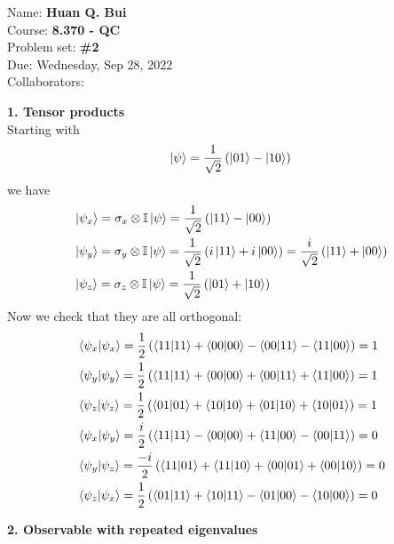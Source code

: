 \documentclass{article}
\theoremstyle{definition}
\newcommand{\f}[2]{\frac{#1}{#2}}
\newcommand{\lp}{\left(}
\newcommand{\rp}{\right)}
\begin{document}
\begin{framed}
\noindent Name: \textbf{Huan Q. Bui}\\
Course: \textbf{8.370 - QC}\\
Problem set: \textbf{\#2}\\
Due: Wednesday, Sep 28, 2022\\
Collaborators: 
\end{framed}

\noindent \textbf{1. Tensor products}\\

\noindent Starting with
\begin{align*}
	\ket{\psi} = \f{1}{\sqrt{2}}\lp \ket{01} - \ket{10} \rp
\end{align*}
we have
\begin{align*}
	&\ket{\psi_x} = \sigma_x \otimes \mathbb{I} \ket{\psi} = \f{1}{\sqrt{2}}\lp \ket{11} - \ket{00} \rp\\
	&\ket{\psi_y} = \sigma_y \otimes \mathbb{I} \ket{\psi} = \f{1}{\sqrt{2}}\lp i \ket{11} + i \ket{00}   \rp = \f{i}{\sqrt{2}}\lp \ket{11} + \ket{00} \rp\\
	&\ket{\psi_z} = \sigma_z\otimes \mathbb{I} \ket{\psi} = \f{1}{\sqrt{2}}\lp \ket{01} + \ket{10} \rp  
\end{align*}
Now we check that they are all orthogonal:
\begin{align*}
	&\braket{\psi_x} = \f{1}{2}\lp \braket{11} + \braket{00} - \bra{00}\ket{11} - \bra{11}\ket{00}  \rp  = 1 \\
	&\braket{\psi_y} = \frac{1}{2}\lp  \braket{11} + \braket{00}  +  \bra{00}\ket{11} + \bra{11}\ket{00}  \rp = 1\\
	&\braket{\psi_z} = \frac{1}{2}\lp \braket{01} + \braket{10} + \bra{01}\ket{10} + \bra{10}\ket{01}  \rp = 1 \\
	&\bra{\psi_x}\ket{\psi_y} =  \f{i}{2}\lp \braket{11} - \braket{00} + \bra{11}\ket{00} - \bra{00}\ket{11} \rp = 0\\
	& \bra{\psi_y} \ket{\psi_z} = \f{-i}{2}\lp \bra{11}\ket{01} + \bra{11}\ket{10} + \bra{00}\ket{01} +  \bra{00}\ket{10}\rp = 0 \\
	&\bra{\psi_z}\ket{\psi_x} = \f{1}{2}\lp \bra{01}\ket{11} + \bra{10}\ket{11} - \bra{01}\ket{00} - \bra{10}\ket{00} \rp = 0
\end{align*}



\noindent \textbf{2. Observable with repeated eigenvalues}
\end{document}
